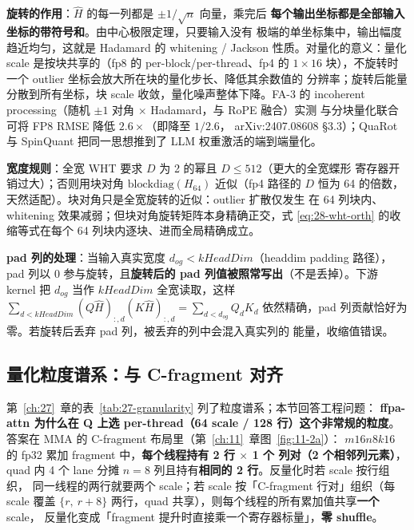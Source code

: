 \textbf{旋转的作用}：$\hat H$ 的每一列都是 $\pm1/\sqrt{n}$ 向量，乘完后
\textbf{每个输出坐标都是全部输入坐标的带符号和}。由中心极限定理，只要输入没有
极端的单坐标集中，输出幅度趋近均匀，这就是 Hadamard 的 whitening / Jackson
性质。对量化的意义：量化 scale 是按块共享的（fp8 的 per-block/per-thread、fp4 的
$1\times16$ 块），不旋转时一个 outlier 坐标会放大所在块的量化步长、降低其余数值的
分辨率；旋转后能量分散到所有坐标，块 scale 收敛，量化噪声整体下降。FA-3 的
incoherent processing（随机 $\pm1$ 对角 $\times$ Hadamard，与 RoPE 融合）实测
与分块量化联合可将 FP8 RMSE 降低 $2.6\times$（即降至 $1/2.6$，
arXiv:2407.08608 \S3.3）；QuaRot 与
SpinQuant 把同一思想推到了 LLM 权重激活的端到端量化。

\textbf{宽度规则}：全宽 WHT 要求 $D$ 为 2 的幂且 $D\le 512$（更大的全宽蝶形
寄存器开销过大）；否则用块对角 $\mathrm{blockdiag}(H_{64})$ 近似（fp4 路径的
$D$ 恒为 64 的倍数，天然适配）。块对角只是全宽旋转的近似：outlier 扩散仅发生
在 64 列块内、whitening 效果减弱；但块对角旋转矩阵本身精确正交，式
\ref{eq:28-wht-orth} 的收缩等式在每个 64 列块内逐块、进而全局精确成立。

\textbf{pad 列的处理}：当输入真实宽度 $d_{og} < kHeadDim$（headdim padding 路径），
pad 列以 0 参与旋转，且\textbf{旋转后的 pad 列值被照常写出}（不是丢掉）。下游
kernel 把 $d_{og}$ 当作 $kHeadDim$ 全宽读取，这样
$\sum_{d<kHeadDim} (Q\hat H)_{:,d}(K\hat H)_{:,d} = \sum_{d<d_{og}} Q_d K_d$
依然精确，pad 列贡献恰好为零。若旋转后丢弃 pad 列，被丢弃的列中会混入真实列的
能量，收缩值错误。

\subsection{量化粒度谱系：与 C-fragment 对齐}\label{sec:28-granularity}

第~\ref{ch:27}~章的表~\ref{tab:27-granularity} 列了粒度谱系；本节回答工程问题：
\textbf{ffpa-attn 为什么在 Q 上选 per-thread（64 scale / 128 行）这个非常规的粒度}。
答案在 MMA 的 C-fragment 布局里（第~\ref{ch:11}~章图~\ref{fig:11-2a}）：
$m16n8k16$ 的 fp32 累加 fragment 中，\textbf{每个线程持有 2 行 $\times$ 1 个
列对（2 个相邻列元素）}，quad 内 4 个 lane 分摊 $n{=}8$ 列且持有\textbf{相同的
2 行}。反量化时若 scale 按行组织，
同一线程的两行就要两个 scale；若 scale 按「C-fragment 行对」组织（每 scale 覆盖
$\{r,\ r+8\}$ 两行，quad 共享），则每个线程的所有累加值共享\textbf{一个} scale，
反量化变成「fragment 提升时直接乘一个寄存器标量」，\textbf{零 shuffle}。

